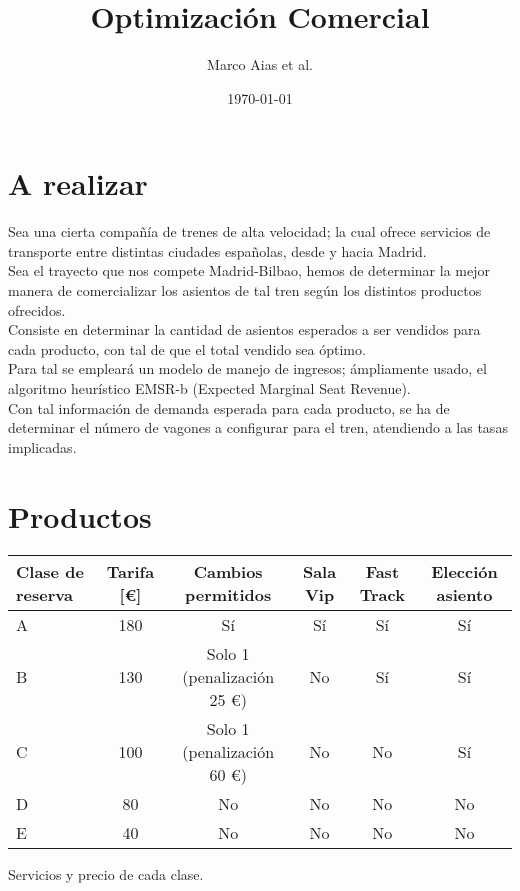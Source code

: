 \documentclass[12pt]{article}
\title{Optimización Comercial}
\author{Marco Aias et al.}
\date{\today}
\begin{document}
\maketitle



\section{A realizar}

Sea una cierta compañía de trenes de alta velocidad; la cual ofrece servicios de transporte entre distintas ciudades españolas, desde y hacia Madrid.\\

Sea el trayecto que nos compete Madrid-Bilbao, hemos de determinar la mejor manera de comercializar los asientos de tal tren según los distintos productos ofrecidos.\\

Consiste en determinar la cantidad de asientos esperados a ser vendidos para cada producto, con tal de que el total vendido sea óptimo. \\

Para tal se empleará un modelo de manejo de ingresos; ámpliamente usado, el algoritmo heurístico EMSR-b (Expected Marginal Seat Revenue).\\

Con tal información de demanda esperada para cada producto, se ha de determinar el número de vagones a configurar para el tren, atendiendo a las tasas implicadas.


\section{Productos}



\begin{adjustwidth}{-2.5 cm}{-2.5 cm}\centering
\begin{threeparttable}[!htb]

\small
\begin{tabular}{lccccc}\toprule
Clase de reserva &Tarifa [\euro] &Cambios permitidos &Sala Vip &Fast Track &Elección asiento \\\midrule
A &180 &Sí &Sí &Sí &Sí \\
B &130 &Solo 1 (penalización 25 \euro) &No &Sí &Sí \\
C &100 &Solo 1 (penalización 60 \euro) &No &No &Sí \\
D &80 &No &No &No &No \\
E &40 &No &No &No &No \\
\bottomrule
\end{tabular}
\caption{Servicios y precio de cada clase.}\label{tab:clases}
\end{threeparttable}

\end{adjustwidth}
\end{document}
